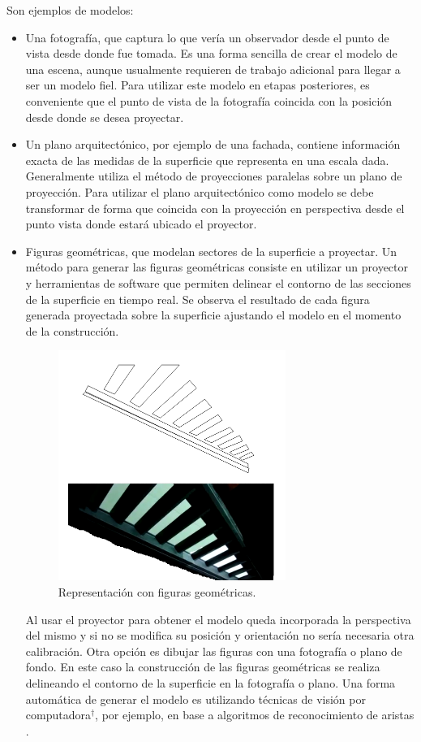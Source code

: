 Son ejemplos de modelos:
\begin{itemize}
  \item Una fotografía, que captura lo que vería un observador desde el punto de vista desde donde fue tomada. Es una forma sencilla de crear el modelo de una escena, aunque usualmente requieren de trabajo adicional para llegar a ser un modelo fiel. Para utilizar este modelo en etapas posteriores, es conveniente que el punto de vista de la fotografía coincida con la posición desde donde se desea proyectar.
  \item Un plano arquitectónico, por ejemplo de una fachada, contiene información exacta de las medidas de la superficie que representa en una escala dada. Generalmente utiliza el método de proyecciones paralelas \cite{LibroCompGrafica} sobre un plano de proyección. Para utilizar el plano arquitectónico como modelo se debe transformar de forma que coincida con la proyección en perspectiva desde el punto vista donde estará ubicado el proyector.
  \item Figuras geométricas, que modelan sectores de la superficie a proyectar. Un método para generar las figuras geométricas consiste en utilizar un proyector y herramientas de software que permiten delinear el contorno de las secciones de la superficie en tiempo real. Se observa el resultado de cada figura generada proyectada sobre la superficie ajustando el modelo en el momento de la construcción.
\begin{figure}[H]
  \centering
    \includegraphics[width=0.7\textwidth]{./Cap2_videomapping/RepresentacionconfigurasGeometricas}
  \caption[Imagen propia]{Representación con figuras geométricas.}
  \label{fig:RepresentacionconfigurasGeometricas}
\end{figure}
Al usar el proyector para obtener el modelo queda incorporada la perspectiva del mismo y si no se modifica su posición y orientación no sería necesaria otra calibración.
Otra opción es dibujar las figuras con una fotografía o plano de fondo. En este caso la construcción de las figuras geométricas se realiza delineando el contorno de la superficie en la fotografía o plano.
Una forma automática de generar el modelo es utilizando técnicas de visión por computadora$^\dagger$, por ejemplo, en base a algoritmos de reconocimiento de aristas \cite{ArticuloAutom2dmodel}.
\end{itemize}


